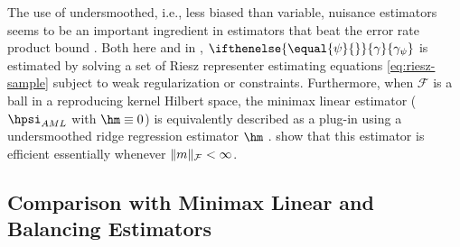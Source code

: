 \documentclass[aos,submission]{imsart}
\theoremstyle{plain}
\theoremstyle{remark}
\newcommand{\riesz}[1][]{\ifthenelse{\equal{#1}{}}{\gamma}{\gamma_{{#1}}}}
\newcommand{\hriesz}[1][]{\ifthenelse{\equal{#1}{}}{\hgamma}{\hgamma_{{#1}}}}
\DeclarePairedDelimiter\norm{\lVert}{\rVert}
\newcommand{\F}{\mathcal{F}}
\begin{document}
The use of undersmoothed, i.e., less biased than variable, nuisance estimators 
seems to be an important ingredient in estimators that beat the error rate product bound \citep[see also][]{kennedy2020optimal,van2019efficient}. 
Both here and in \citet{newey2018cross}, $\riesz[\psi]$ is estimated by solving a set of Riesz representer estimating equations \eqref{eq:riesz-sample}
subject to weak regularization or constraints. 
Furthermore, when $\F$ is a ball in a reproducing kernel Hilbert space,
the minimax linear estimator ($\hpsi_{AML}$ with $\hm \equiv 0$) is
equivalently described as a plug-in using a undersmoothed ridge regression estimator $\hm$ \citep[Theorem 22]{kallus2016generalized}.
\citet{hirshberg2019minimax} show that this estimator is efficient essentially whenever $\norm{m}_{\F} < \infty$.



\subsection{Comparison with Minimax Linear and Balancing Estimators}
\label{sec:balancing}
\end{document}
